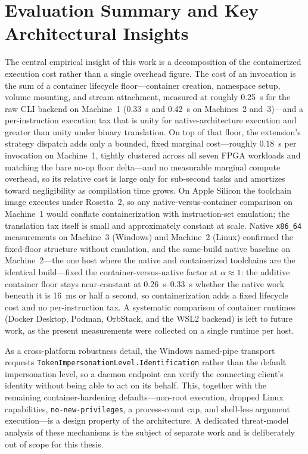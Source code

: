 \section{Evaluation Summary and Key Architectural Insights}
The central empirical insight of this work is a decomposition of the containerized execution cost rather than a single overhead figure. The cost of an invocation is the sum of a container lifecycle floor---container creation, namespace setup, volume mounting, and stream attachment, measured at roughly \SI{0.25}{\second} for the raw CLI backend on Machine~1 (\SI{0.33}{\second} and \SI{0.42}{\second} on Machines~2 and~3)---and a per-instruction execution tax that is unity for native-architecture execution and greater than unity under binary translation. On top of that floor, the extension's strategy dispatch adds only a bounded, fixed marginal cost---roughly \SI{0.18}{\second} per invocation on Machine~1, tightly clustered across all seven FPGA workloads and matching the bare no-op floor delta---and no measurable marginal compute overhead, so its relative cost is large only for sub-second tasks and amortizes toward negligibility as compilation time grows. On Apple Silicon the toolchain image executes under Rosetta~2, so any native-versus-container comparison on Machine~1 would conflate containerization with instruction-set emulation; the translation tax itself is small and approximately constant at scale. Native \texttt{x86\_64} measurements on Machine~3 (Windows) and Machine~2 (Linux) confirmed the fixed-floor structure without emulation, and the same-build native baseline on Machine~2---the one host where the native and containerized toolchains are the identical build---fixed the container-versus-native factor at $\alpha \approx 1$: the additive container floor stays near-constant at \SIrange{0.26}{0.33}{\second} whether the native work beneath it is \SI{16}{\milli\second} or half a second, so containerization adds a fixed lifecycle cost and no per-instruction tax. A systematic comparison of container runtimes (Docker Desktop, Podman, OrbStack, and the WSL2 backend) is left to future work, as the present measurements were collected on a single runtime per host.

As a cross-platform robustness detail, the Windows named-pipe transport requests \texttt{TokenImpersonationLevel.Identification} rather than the default impersonation level, so a daemon endpoint can verify the connecting client's identity without being able to act on its behalf. This, together with the remaining container-hardening defaults---non-root execution, dropped Linux capabilities, \texttt{no-new-privileges}, a process-count cap, and shell-less argument execution---is a design property of the architecture. A dedicated threat-model analysis of these mechanisms is the subject of separate work and is deliberately out of scope for this thesis.

